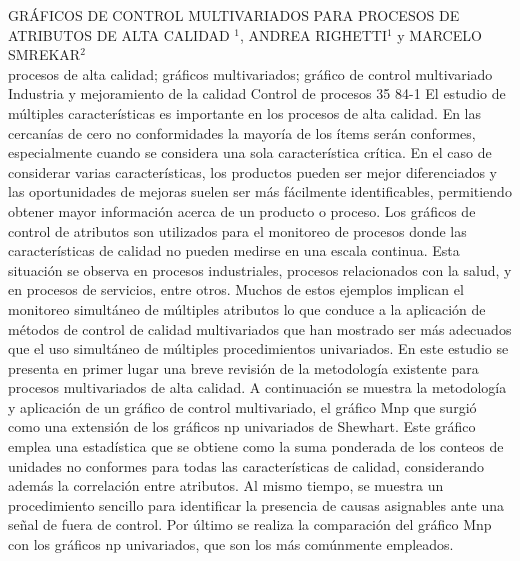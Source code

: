 \A
{GRÁFICOS DE CONTROL MULTIVARIADOS PARA PROCESOS DE ATRIBUTOS DE ALTA CALIDAD}
{$^1$, ANDREA RIGHETTI$^1$ y MARCELO SMREKAR$^2$}
{
\\}
{procesos de alta calidad; gráficos multivariados; gráfico de control multivariado} 
 {Industria y mejoramiento de la calidad} 
 {Control de procesos} 
 {35} 
 {84-1}
{El estudio de múltiples características es importante en los procesos de alta calidad. En las cercanías de cero no conformidades la mayoría de los ítems serán conformes, especialmente cuando se considera una sola característica crítica. En el caso de considerar varias características, los productos pueden ser mejor diferenciados y las oportunidades de mejoras suelen ser más fácilmente identificables, permitiendo obtener mayor información acerca de un producto o proceso. Los gráficos de control de atributos son utilizados para el monitoreo de procesos donde las características de calidad no pueden medirse en una escala continua. Esta situación se observa en procesos industriales, procesos relacionados con la salud, y en procesos de servicios, entre otros. Muchos de estos ejemplos implican el monitoreo simultáneo de múltiples atributos lo que conduce a la aplicación de métodos de control de calidad multivariados que han mostrado ser más adecuados que el uso simultáneo de múltiples procedimientos univariados. En este estudio se presenta en primer lugar una breve revisión de la metodología existente para procesos multivariados de alta calidad. A continuación se muestra la metodología y aplicación de un gráfico de control multivariado, el gráfico Mnp que surgió como una extensión de los gráficos np univariados de Shewhart. Este gráfico emplea una estadística que se obtiene como la suma ponderada de los conteos de unidades no conformes para todas las características de calidad, considerando además la correlación entre atributos. Al mismo tiempo, se muestra un procedimiento sencillo para identificar la presencia de causas asignables ante una señal de fuera de control. Por último se realiza la comparación del gráfico Mnp con los gráficos np univariados, que son los más comúnmente empleados.}
